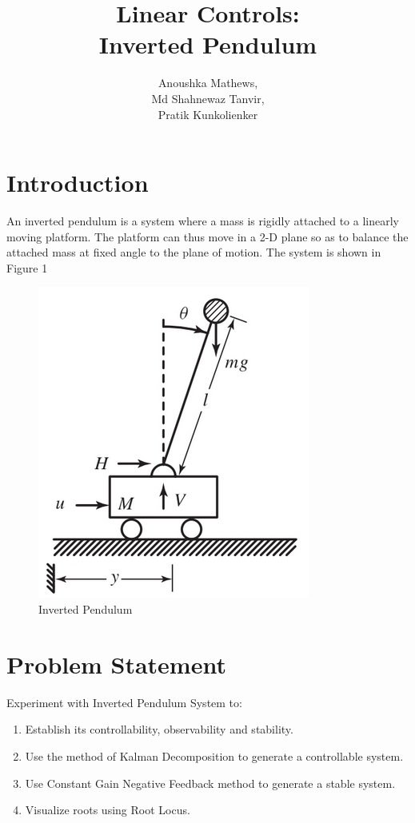\documentclass[11pt]{article}
\title{Linear Controls: \\ Inverted Pendulum}
\author{Anoushka Mathews, \\Md Shahnewaz Tanvir, \\ Pratik Kunkolienker}
\providecommand{\tightlist}{%
      \setlength{\itemsep}{0pt}\setlength{\parskip}{0pt}}
\begin{document}
    
    \maketitle
    \newpage
    \tableofcontents
    \newpage
    

    



\section{Introduction}\label{introduction}

An inverted pendulum is a system where a mass is rigidly attached to a
linearly moving platform. The platform can thus move in a 2-D plane so
as to balance the attached mass at fixed angle to the plane of motion.
The system is shown in Figure 1

\begin{figure}
\centering
\includegraphics{./Figures/InvertedPendulum.png}
\caption{Inverted Pendulum}
\end{figure}

\section{Problem Statement}\label{problem-statement}

Experiment with Inverted Pendulum System to:

\begin{enumerate}
\def\labelenumi{\arabic{enumi}.}
\tightlist
\item
  Establish its controllability, observability and stability.
\item
  Use the method of Kalman Decomposition to generate a controllable
  system.
\item
  Use Constant Gain Negative Feedback method to generate a stable
  system.
\item
  Visualize roots using Root Locus.
\end{enumerate}
\end{document}
